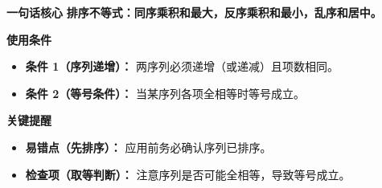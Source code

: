 \begin{summarybox}
	\textbf{\textcolor{CSummary}{一句话核心}}
	\textbf{排序不等式：同序乘积和最大，反序乘积和最小，乱序和居中。}

	\medskip
	\textbf{\textcolor{CSummary}{使用条件}}
	\begin{itemize}[leftmargin=*, itemsep=0.5em, topsep=0.4em]
		\item \textbf{条件 1（序列递增）：} 两序列必须递增（或递减）且项数相同。
		\item \textbf{条件 2（等号条件）：} 当某序列各项全相等时等号成立。
	\end{itemize}

	\medskip
	\textbf{\textcolor{CSummary}{关键提醒}}
	\begin{itemize}[leftmargin=*, itemsep=0.5em, topsep=0.4em]
		\item \textbf{易错点（先排序）：} 应用前务必确认序列已排序。
		\item \textbf{检查项（取等判断）：} 注意序列是否可能全相等，导致等号成立。
	\end{itemize}

\end{summarybox}
